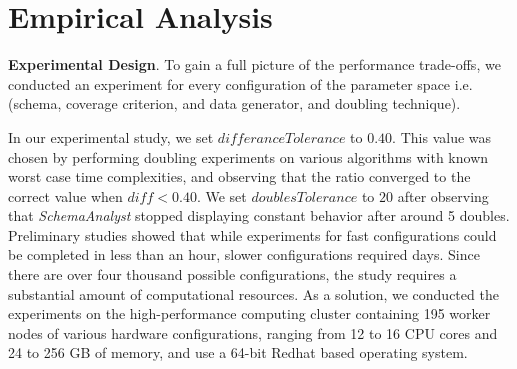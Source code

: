 
\section{Empirical Analysis}

\textbf{Experimental Design}. To gain a full picture of the performance trade-offs, we conducted an experiment for every configuration
of the parameter space i.e. (schema, coverage criterion, and data generator, and doubling technique). 

In our experimental study, we set $\mathit{differanceTolerance}$ to $0.40$. This value was chosen by performing doubling
experiments on various algorithms with known worst case time complexities, and observing that the ratio converged to the
correct value when $\mathit{diff} < 0.40$.  We set $\mathit{doublesTolerance}$ to $20$ after observing that
\textit{SchemaAnalyst} stopped displaying constant behavior after around 5 doubles.  Preliminary studies showed that
while experiments for fast configurations could be completed in less than an hour, slower configurations required days.
Since there are over four thousand possible configurations, the study requires a substantial amount of computational
resources.  As a solution, we conducted the experiments on the high-performance computing cluster containing 195 worker
nodes of various hardware configurations, ranging from 12 to 16 CPU cores and 24 to 256 GB of memory, and use a 64-bit
Redhat based operating system.
